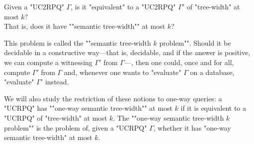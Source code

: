 \begin{center}
    \AP 
    Given a "UC2RPQ" $\Gamma$, is it "equivalent" to a "UC2RPQ" $\Gamma'$ of "tree-width" at most $k$?\\
    That is, does it have ""semantic tree-width"" at most $k$?
\end{center}
This problem is called the ""semantic tree-width $k$ problem"".
Should it be decidable in a constructive way---that is, decidable, and if the answer is positive, we can compute a witnessing $\Gamma'$ from $\Gamma$---, then one could, once and for all,
compute $\Gamma'$ from $\Gamma$ and, whenever one wants to "evaluate" $\Gamma$ on a
database, "evaluate" $\Gamma'$ instead.

We will also study the restriction of these notions to one-way queries: a "UCRPQ" has \AP""one-way semantic tree-width"" at most $k$ if it is equivalent to a "UCRPQ" of "tree-width" at most $k$. The \AP""one-way semantic tree-width $k$ problem"" is the problem of, given a "UCRPQ" $\Gamma$, whether it has "one-way semantic tree-width" at most $k$.

